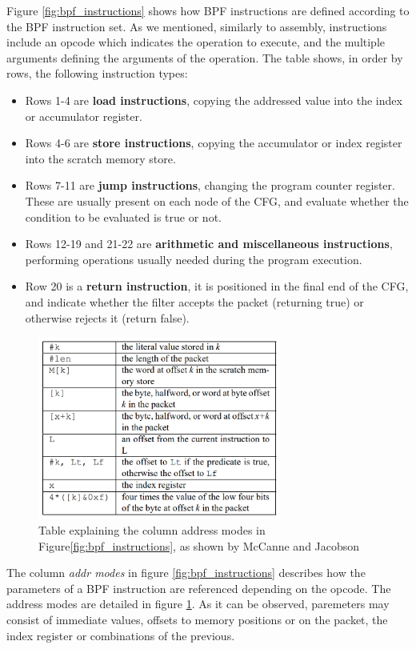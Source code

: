 \documentclass[12pt]{report} %
\begin{document}
Figure \ref{fig:bpf_instructions} shows how BPF instructions are defined according to the BPF instruction set. As we mentioned, similarly to assembly, instructions include an opcode which indicates the operation to execute, and the multiple arguments defining the arguments of the operation. The table shows, in order by rows, the following instruction types\cite{bpf_bsd_origin_bpf_page8}:
\begin{itemize}
\item Rows 1-4 are \textbf{load instructions}, copying the addressed value into the index or accumulator register.
\item Rows 4-6 are \textbf{store instructions}, copying the accumulator or index register into the scratch memory store.
\item Rows 7-11 are \textbf{jump instructions}, changing the program counter register. These are usually present on each node of the CFG, and evaluate whether the condition to be evaluated is true or not.
\item Rows 12-19 and 21-22 are \textbf{arithmetic and miscellaneous instructions}, performing operations usually needed during the program execution.
\item Row 20 is a \textbf{return instruction}, it is positioned in the final end of the CFG, and indicate whether the filter accepts the packet (returning true) or otherwise rejects it (return false).
\end{itemize}

\begin{figure}[H]
	\centering
	\includegraphics[width=8cm]{bpf_address_mode.png}
	\caption{Table explaining the column address modes in Figure\ref{fig:bpf_instructions}, as shown by McCanne and Jacobson\cite{bpf_bsd_origin_bpf_page8}}
	\label{fig:bpf_address_mode}
\end{figure}

The column \textit{addr modes} in figure \ref{fig:bpf_instructions} describes how the parameters of a BPF instruction are referenced depending on the opcode. The address modes are detailed in figure \ref{fig:bpf_address_mode}. As it can be observed, paremeters may consist of immediate values, offsets to memory positions or on the packet, the index register or combinations of the previous.
\end{document}
